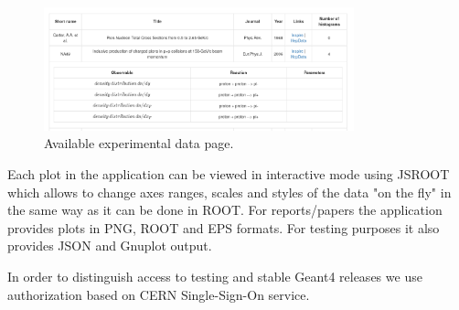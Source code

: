 \begin{figure}[h]
    \centering
    \includegraphics[width=0.8\textwidth,clip]{expdata.png}
    \caption{Available experimental data page.}
    \label{fig:exppage}
\end{figure}

Each plot in the application can be viewed in interactive mode using JSROOT~\cite{JSROOT} which allows to change axes ranges, scales and styles of the data  "on the fly" in the same way as it can be done in ROOT. For reports/papers the application provides plots in PNG, ROOT and EPS formats. For testing purposes it also provides JSON and Gnuplot output.

In order to distinguish access to testing and stable Geant4 releases we use authorization based on CERN Single-Sign-On service.





